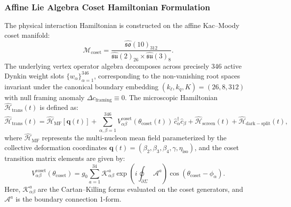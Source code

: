 \documentclass[11pt,onecolumn]{article}
\begin{document}
\subsubsection{Affine Lie Algebra Coset Hamiltonian Formulation}
The physical interaction Hamiltonian is constructed on the affine Kac--Moody coset manifold:
\begin{equation}
\mathcal{M}_{\mathrm{coset}} = \frac{\widehat{\mathfrak{so}}(10)_{312}}{\widehat{\mathfrak{su}}(2)_{26} \times \widehat{\mathfrak{su}}(3)_8}.
\label{eq:coset_manifold}
\end{equation}
The underlying vertex operator algebra decomposes across precisely 346 active Dynkin weight slots $\{w_\alpha\}_{\alpha=1}^{346}$, corresponding to the non-vanishing root spaces invariant under the canonical boundary embedding $(k_\ell, k_q, K) = (26, 8, 312)$ with null framing anomaly $\Delta c_{\mathrm{framing}} \equiv 0$. The microscopic Hamiltonian $\widehat{\mathcal{H}}_{\mathrm{trans}}(t)$ is defined as:
\begin{equation}
\widehat{\mathcal{H}}_{\mathrm{trans}}(t) = \widehat{\mathcal{H}}_{\mathrm{MF}}[\mathbf{q}(t)] + \sum_{\alpha,\beta=1}^{346} V_{\alpha\beta}^{\mathrm{coset}}(\theta_{\mathrm{coset}}(t))\, \hat{c}_\alpha^\dagger \hat{c}_\beta + \widehat{\mathcal{H}}_{\mathrm{screen}}(t) + \widehat{\mathcal{H}}_{\mathrm{dark-split}}(t),
\label{eq:transmutation_hamiltonian}
\end{equation}
where $\widehat{\mathcal{H}}_{\mathrm{MF}}$ represents the multi-nucleon mean field parameterized by the collective deformation coordinates $\mathbf{q}(t) = (\beta_2, \beta_3, \beta_4, \gamma, \eta_{\mathrm{iso}})$, and the coset transition matrix elements are given by:
\begin{equation}
V_{\alpha\beta}^{\mathrm{coset}}(\theta_{\mathrm{coset}}) = g_0 \sum_{a=1}^{34} \mathcal{K}^a_{\alpha\beta} \exp\left( i \oint_{\partial \Sigma} \mathcal{A}^a \right) \cos(\theta_{\mathrm{coset}} - \phi_\alpha).
\label{eq:v_coset_def}
\end{equation}
Here, $\mathcal{K}^a_{\alpha\beta}$ are the Cartan--Killing forms evaluated on the coset generators, and $\mathcal{A}^a$ is the boundary connection 1-form.
\end{document}
